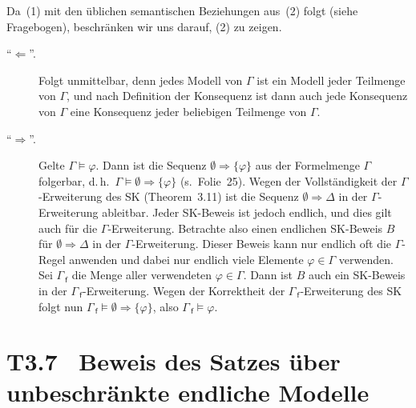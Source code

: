 \documentclass[fontsize=11pt, twoside=false, numbers=autoenddot]{scrbook}
\begin{document}
%
\begin{beweis}
  Da~(1) mit den üblichen semantischen Beziehungen aus~(2) folgt
  (siehe Fragebogen),
  beschränken wir uns darauf, (2) zu zeigen.
  \begin{description}
    \item[{\boldmath "`$\Leftarrow$"'.}]
      Folgt unmittelbar, denn jedes Modell von $\Gamma$ ist ein Modell jeder Teilmenge von $\Gamma$,
      und nach Definition der Konsequenz
      ist dann auch jede Konsequenz von $\Gamma$ eine Konsequenz jeder beliebigen Teilmenge von $\Gamma$.
      \par\smallskip
    \item[{\boldmath "`$\Rightarrow$"'.}]
      Gelte $\Gamma \models \varphi$.
      Dann ist die Sequenz $\emptyset \Rightarrow \{\varphi\}$
      aus der Formelmenge $\Gamma$ folgerbar,
      d.\,h.\ $\Gamma \models \emptyset \Rightarrow \{\varphi\}$
      (s.\ Folie~25).
      Wegen der Vollständigkeit der $\Gamma$-Erweiterung des SK (Theorem~3.11)
      ist die Sequenz $\emptyset \Rightarrow \Delta$ in der $\Gamma$-Erweiterung ableitbar.
      Jeder SK-Beweis ist jedoch endlich, und dies gilt auch für die $\Gamma$-Erweiterung.
      Betrachte also einen endlichen SK-Beweis $B$ für $\emptyset \Rightarrow \Delta$
      in der $\Gamma$-Erweiterung.
      Dieser Beweis kann nur endlich oft die $\Gamma$-Regel anwenden
      und dabei nur endlich viele Elemente $\varphi \in \Gamma$ verwenden.
      Sei $\Gamma_{\!\!\:\textsf{f}}$ die Menge aller verwendeten $\varphi \in \Gamma$.
      Dann ist $B$ auch ein SK-Beweis in der $\Gamma_{\!\!\:\textsf{f}}$-Erweiterung.
      Wegen der Korrektheit der $\Gamma_{\!\!\:\textsf{f}}$-Erweiterung des SK
      folgt nun $\Gamma_{\!\!\:\textsf{f}} \models \emptyset \Rightarrow \{\varphi\}$,
      also $\Gamma_{\!\!\:\textsf{f}} \models \varphi$.
      \qedhere
  \end{description}
\end{beweis}%

\section*{T3.7~ Beweis des Satzes über unbeschränkte endliche Modelle}
\end{document}
